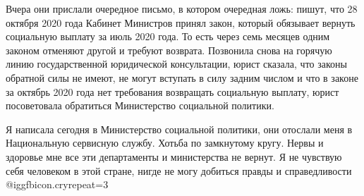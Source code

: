 Вчера  они прислали очередное письмо, в котором очередная ложь: пишут, что 28
октября 2020 года Кабинет Министров принял закон, который обязывает вернуть
социальную выплату за июль 2020 года.  То есть через семь месяцев одним законом
отменяют другой и требуют возврата.  Позвонила снова на горячую линию
государственной юридической консультации, юрист сказала, что законы обратной
силы не имеют, не могут вступать в силу задним числом и что в законе за октябрь
2020 года нет требования возвращать социальную выплату, юрист посоветовала
обратиться Министерство социальной политики. 

Я написала   сегодня в Министерство социальной политики, они отослали меня в
Национальную сервисную службу. Хотьба по замкнутому кругу.  Нервы и здоровье
мне все эти департаменты и министерства не вернут.  Я не чувствую себя
человеком в этой стране, нигде не могу добиться правды и справедливости @igg{fbicon.cry}{repeat=3} 

